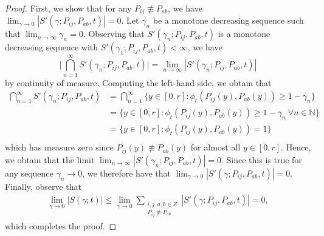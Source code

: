 \documentclass{article}
\newcommand{\N}{\mathbb{N}}
\newcommand{\1}{\mathbbm{1}}
\theoremstyle{definition}
\theoremstyle{plain}
\begin{document}
\begin{proof}
    First, we show that for any $P_{ij} \not \equiv P_{ab}$, we have $\lim_{\gamma \to 0} |S'(\gamma; P_{ij}, P_{ab}, t)| = 0$. Let $\gamma_n$ be a monotone decreasing sequence such that $\lim_{n \to \infty} \gamma_n = 0$. Observing that $S'(\gamma_n; P_{ij}, P_{ab}, t)$ is a monotone decreasing sequence with $S'(\gamma_1; P_{ij}, P_{ab}, t) < \infty$, we have
    \begin{equation*}
        \bigg|\bigcap_{n=1}^\infty S'(\gamma_n; P_{ij}, P_{ab}, t)\bigg| = \lim_{n \to \infty} |S'(\gamma_n; P_{ij}, P_{ab}, t)|
    \end{equation*}
    by continuity of measure. Computing the left-hand side, we obtain that
    \begin{equation*}
    \begin{aligned}
        \bigcap_{n=1}^\infty S'(\gamma_n; P_{ij}, P_{ab}, t) &= \bigcap_{n=1}^\infty \{y \in [0, r]: \phi_t(P_{ij}(y), P_{ab}(y)) \geq 1 - \gamma_n\} \\
        &= \{y \in [0, r]: \phi_t(P_{ij}(y), P_{ab}(y)) \geq 1 - \gamma_n \: \forall n \in \N\} \\
        &= \{y \in [0, r]: \phi_t(P_{ij}(y), P_{ab}(y)) = 1\} \\
    \end{aligned}
    \end{equation*}
    which has measure zero since $P_{ij}(y) \not\equiv P_{ab}(y)$ for almost all $y \in [0, r]$. Hence, we obtain that the limit $\lim_{n \to \infty} |S'(\gamma_n; P_{ij}, P_{ab}, t)| = 0$. Since this is true for any sequence $\gamma_n \to 0$, we therefore have that $\lim_{\gamma \to 0} |S'(\gamma; P_{ij}, P_{ab}, t)| = 0$. Finally, observe that
    \begin{align*}
        \lim_{\gamma \to 0} |S(\gamma; t)| \leq \lim_{\gamma \to 0} \sum_{\substack{i,j,a,b \in Z \\ P_{ij} \not \equiv P_{ab}}} |S'(\gamma; P_{ij}, P_{ab}, t)| = 0,
    \end{align*}
    which completes the proof.
\end{proof}
\end{document}
